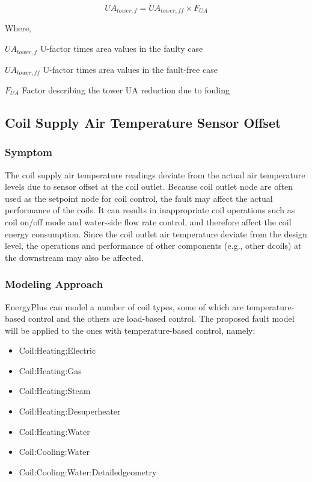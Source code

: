 \begin{equation}
UA_{tower,f} = UA_{tower,ff} \times F_{UA}
\end{equation}

Where,

\(UA_{tower,f}\) U-factor times area values in the faulty case

\(UA_{tower,ff}\) U-factor times area values in the fault-free case

\(F_{UA}\) Factor describing the tower UA reduction due to fouling


\subsection{Coil Supply Air Temperature Sensor Offset}\label{coil-supply-air-temperature-sensor-offset}

\subsubsection{Symptom}

The coil supply air temperature readings deviate from the actual air temperature levels due to sensor offset at the coil outlet. Because coil outlet node are often used as the setpoint node for coil control, the fault may affect the actual performance of the coils. It can results in inappropriate coil operations such as coil on/off mode and water-side flow rate control, and therefore affect the coil energy consumption. Since the coil outlet air temperature deviate from the design level, the operations and performance of other components (e.g., other dcoils) at the downstream may also be affected.

\subsubsection{Modeling Approach}

EnergyPlus can model a number of coil types, some of which are temperature-based control and the others are load-based control. The proposed fault model will be applied to the ones with temperature-based control, namely:

\begin{itemize}
\tightlist
\item
  Coil:Heating:Electric
\item
  Coil:Heating:Gas
\item
  Coil:Heating:Steam
\item
  Coil:Heating:Desuperheater
\item
  Coil:Heating:Water
\item
  Coil:Cooling:Water
\item
  Coil:Cooling:Water:Detailedgeometry
\end{itemize}

